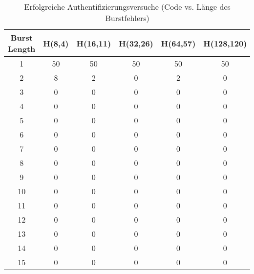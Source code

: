 \begin{table}[h!]
    \centering
    \begin{tabular}{c|ccccc}
        Burst Length & H(8,4) & H(16,11) & H(32,26) & H(64,57) & H(128,120)\\\hline
        1 &      50&      50&      50&      50&      50\\      
        2 &      8 &      2 &      0 &      2 &      0 \\      
        3 &      0 &      0 &      0 &      0 &      0 \\      
        4 &      0 &      0 &      0 &      0 &      0 \\      
        5 &      0 &      0 &      0 &      0 &      0 \\      
        6 &      0 &      0 &      0 &      0 &      0 \\      
        7 &      0 &      0 &      0 &      0 &      0 \\      
        8 &      0 &      0 &      0 &      0 &      0 \\      
        9 &      0 &      0 &      0 &      0 &      0 \\      
        10&      0 &      0 &      0 &      0 &      0 \\      
        11&      0 &      0 &      0 &      0 &      0 \\      
        12&      0 &      0 &      0 &      0 &      0 \\      
        13&      0 &      0 &      0 &      0 &      0 \\      
        14&      0 &      0 &      0 &      0 &      0 \\      
        15&      0 &      0 &      0 &      0 &      0
    \end{tabular}
    \caption{Erfolgreiche Authentifizierungsversuche (Code vs. Länge des Burstfehlers)}
    \label{tab:burst_result}
\end{table}